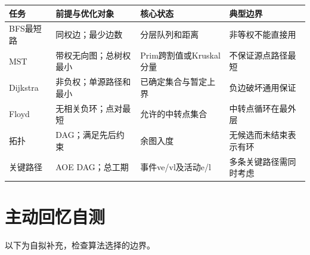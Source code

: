 \begin{wideblock}

\par\medskip\noindent\begin{minipage}{\linewidth}\fontsize{9.3}{12}\selectfont\begin{tabularx}{\linewidth}{@{}YYYY@{}}
\toprule\noalign{}
\begin{minipage}[b]{\linewidth}\raggedright
任务
\end{minipage} & \begin{minipage}[b]{\linewidth}\raggedright
前提与优化对象
\end{minipage} & \begin{minipage}[b]{\linewidth}\raggedright
核心状态
\end{minipage} & \begin{minipage}[b]{\linewidth}\raggedright
典型边界
\end{minipage} \\
\midrule\noalign{}


BFS最短路 & 同权边；最少边数 & 分层队列和距离 & 非等权不能直接用 \\
MST & 带权无向图；总树权最小 & Prim跨割值或Kruskal分量 & 不保证源点路径最短 \\
Dijkstra & 非负权；单源路径和最小 & 已确定集合与暂定上界 & 负边破坏通用保证 \\
Floyd & 无相关负环；点对最短 & 允许的中转点集合 & 中转点循环在最外层 \\
拓扑 & DAG；满足先后约束 & 余图入度 & 无候选而未结束表示有环 \\
关键路径 & AOE DAG；总工期 & 事件ve/vl及活动e/l & 多条关键路径需同时考虑 \\
\bottomrule\end{tabularx}
\end{minipage}\par\medskip

\end{wideblock}

\section{主动回忆自测}\label{DS06-check}

以下为自拟补充，检查算法选择的边界。

